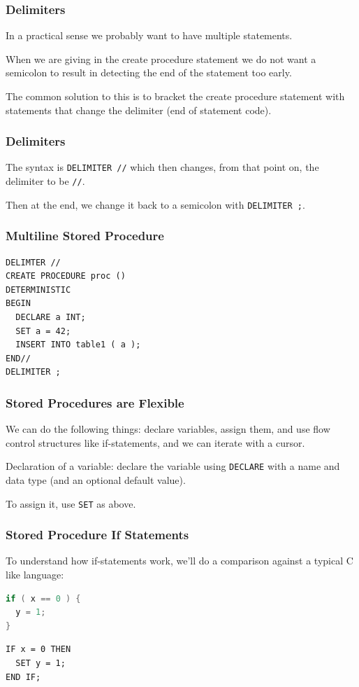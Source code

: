 \begin{frame}
\frametitle{Delimiters}

In a practical sense we probably want to have multiple statements. 

When we are giving in the create procedure statement we do not want a semicolon to result in detecting the end of the statement too early.

The common solution to this is to bracket the create procedure statement with statements that change the delimiter (end of statement code). 

\end{frame}

\begin{frame}
\frametitle{Delimiters}


The syntax is \texttt{DELIMITER //} which then changes, from that point on, the delimiter to be \texttt{//}. 
 
Then at the end, we change it back to a semicolon with \texttt{DELIMITER ;}.


\end{frame}

\begin{frame}[fragile]
\frametitle{Multiline Stored Procedure}

{\small
\begin{verbatim}
DELIMTER //
CREATE PROCEDURE proc () 
DETERMINISTIC
BEGIN
  DECLARE a INT;
  SET a = 42;
  INSERT INTO table1 ( a );
END//
DELIMITER ;
\end{verbatim}
}

\end{frame}

\begin{frame}
\frametitle{Stored Procedures are Flexible}
We can do the following things: declare variables, assign them, and use flow control structures like if-statements, and we can iterate with a cursor.

Declaration of a variable: declare the variable using \texttt{DECLARE} with a name and data type (and an optional default value).

To assign it, use \texttt{SET} as above. 


\end{frame}


\begin{frame}[fragile]
\frametitle{Stored Procedure If Statements}

To understand how if-statements work, we'll do a comparison against a typical C like language:

\begin{multicols}{2}
\begin{lstlisting}[language=C]
if ( x == 0 ) {
  y = 1;
} 
\end{lstlisting}
\columnbreak
\begin{verbatim}
IF x = 0 THEN
  SET y = 1;
END IF;
\end{verbatim}
\end{multicols}



\end{frame}


